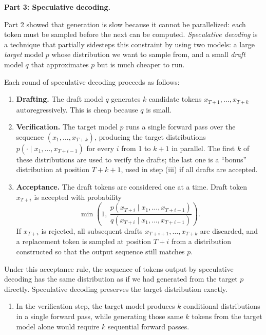 \documentclass[submit]{../harvardml}
\begin{document}
\newpage

\begin{framed}
\noindent \textbf{Part 3: Speculative decoding.}

\noindent Part 2 showed that generation is slow because it cannot be parallelized: each token must be sampled before the next can be computed. \emph{Speculative decoding} is a technique that partially sidesteps this constraint by using two models: a large \emph{target} model $p$ whose distribution we want to sample from, and a small \emph{draft} model $q$ that approximates $p$ but is much cheaper to run.

Each round of speculative decoding proceeds as follows:

\begin{enumerate}
  \item[(i)] \textbf{Drafting.} The draft model $q$ generates $k$ candidate tokens $x_{T+1}, \ldots, x_{T+k}$ autoregressively. This is cheap because $q$ is small.
  \item[(ii)] \textbf{Verification.} The target model $p$ runs a single forward pass over the sequence $(x_1, \ldots, x_{T+k})$, producing the target distributions $p(\cdot \mid x_1, \ldots, x_{T+i-1})$ for every $i$ from 1 to $k+1$ in parallel. The first $k$ of these distributions are used to verify the drafts; the last one is a ``bonus'' distribution at position $T+k+1$, used in step (iii) if all drafts are accepted.
  \item[(iii)] \textbf{Acceptance.} The draft tokens are considered one at a time. Draft token $x_{T+i}$ is accepted with probability
  \[
  \min\!\left(1, \ \frac{p(x_{T+i} \mid x_1, \ldots, x_{T+i-1})}{q(x_{T+i} \mid x_1, \ldots, x_{T+i-1})}\right).
  \]
  If $x_{T+i}$ is rejected, all subsequent drafts $x_{T+i+1}, \ldots, x_{T+k}$ are discarded, and a replacement token is sampled at position $T+i$ from a distribution constructed so that the output sequence still matches $p$.
\end{enumerate}

Under this acceptance rule, the sequence of tokens output by speculative decoding has the same distribution as if we had generated from the target $p$ directly. Speculative decoding preserves the target distribution exactly.

\begin{enumerate}
  \item[3a.] In the verification step, the target model produces $k$ conditional distributions in a single forward pass, while generating those same $k$ tokens from the target model alone would require $k$ sequential forward passes.
  

\end{enumerate}
\end{framed}
\end{document}
